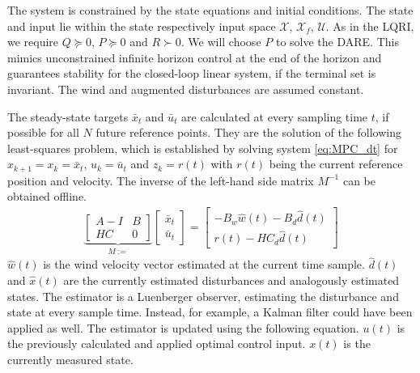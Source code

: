 The system is constrained by the state equations and initial conditions. The state and input lie within the state respectively input space $\mathcal{X}$, $\mathcal{X}_f$, $\mathcal{U}$. As in the LQRI, we require $Q\succeq0$, $P\succeq0$ and $R\succ0$. We will choose $P$ to solve the DARE. This mimics unconstrained infinite horizon control at the end of the horizon and guarantees stability for the closed-loop linear system, if the terminal set is invariant. The wind and augmented disturbances are assumed constant.

The steady-state targets $\bar{x}_t$ and $\bar{u}_t$ are calculated at every sampling time $t$, if possible for all $N$ future reference points. They are the solution of the following least-squares problem, which is established by solving system \ref{eq:MPC_dt} for $x_{k+1}=x_k=\bar{x}_t$, $u_k = \bar{u}_t$ and $z_k = r(t)$ with $r(t)$ being the current reference position and velocity. The inverse of the left-hand side matrix $M^{-1}$ can be obtained offline.
\begin{align}
\underbrace{\begin{bmatrix}
A-I & B \\
HC & 0 
\end{bmatrix}}_{M:=}
\begin{bmatrix}
\bar{x}_t \\
\bar{u}_t
\end{bmatrix}
=
\begin{bmatrix}
-B_w \hat{w}(t) - B_d \hat{d}(t)\\
r(t) - H C_d \hat{d}(t) \label{eq:steady_state_ls}
\end{bmatrix}
\end{align}
$\hat{w}(t)$ is the wind velocity vector estimated at the current time sample. $\hat{d}(t)$ and $\hat x (t)$ are the currently estimated disturbances and analogously estimated states. The estimator is a Luenberger observer, estimating the disturbance and state at every sample time. Instead, for example, a Kalman filter could have been applied as well. The estimator is updated using the following equation. $u(t)$ is the previously calculated and applied optimal control input. $x(t)$ is the currently measured state.
